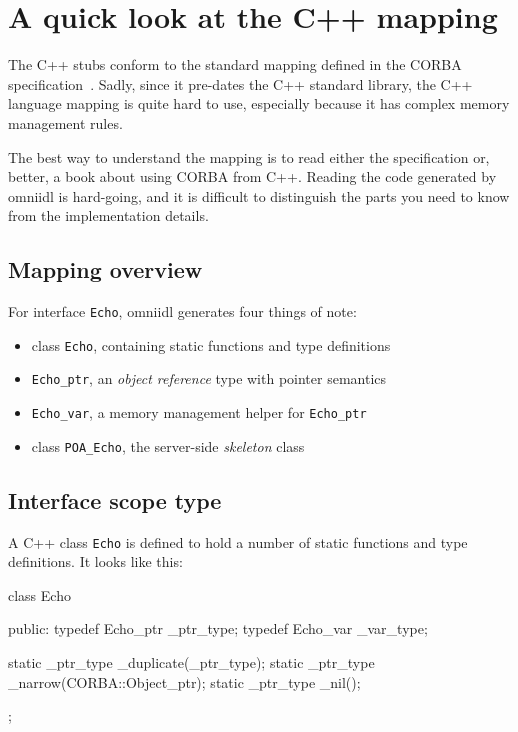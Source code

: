 \documentclass[11pt,twoside,a4paper]{book}
\newcommand{\type}[1]{\texttt{#1}}
\begin{document}
\section{A quick look at the C++ mapping}

The C++ stubs conform to the standard mapping defined in the CORBA
specification~\cite{cxxmapping}. Sadly, since it pre-dates the C++
standard library, the C++ language mapping is quite hard to use,
especially because it has complex memory management rules.

The best way to understand the mapping is to read either the
specification or, better, a book about using CORBA from C++. Reading
the code generated by omniidl is hard-going, and it is difficult to
distinguish the parts you need to know from the implementation
details.


\subsection{Mapping overview}

For interface \type{Echo}, omniidl generates four things of note:

\begin{itemize}
\item class \type{Echo}, containing static functions and type
  definitions

\item \type{Echo\_ptr}, an \emph{object reference} type with pointer
  semantics

\item \type{Echo\_var}, a memory management helper for
  \type{Echo\_ptr}

\item class \type{POA\_Echo}, the server-side \emph{skeleton} class

\end{itemize}


\subsection{Interface scope type}

A C++ class \type{Echo} is defined to hold a number of static
functions and type definitions. It looks like this:

\begin{cxxlisting}
class Echo {
public:
  typedef Echo_ptr _ptr_type;
  typedef Echo_var _var_type;

  static _ptr_type _duplicate(_ptr_type);
  static _ptr_type _narrow(CORBA::Object_ptr);
  static _ptr_type _nil();
};
\end{cxxlisting}
\end{document}
